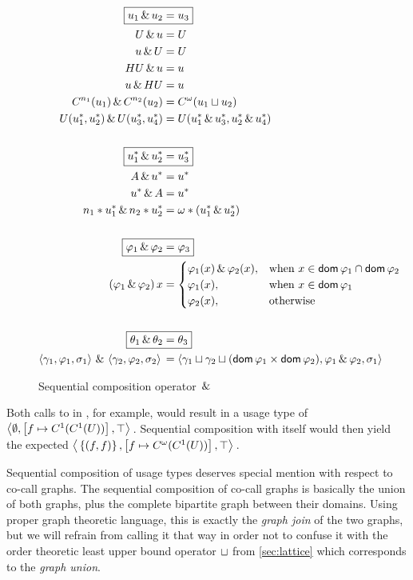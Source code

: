 \begin{figure}
\begin{alignat*}{1}
  \Aboxed{u_1 \both u_2 &= u_3} \\
  U \both u  &= U \\
  u \both U  &= U \\
  HU \both u &= u \\
  u \both HU &= u \\
  C^{n_1}(u_1) \both C^{n_2}(u_2) &= C^{\omega}(u_1 \llub u_2) \\
  U(u^*_1, u^*_2) \both U(u^*_3, u^*_4) &= U(u^*_1 \both u^*_3, u^*_2 \both u^*_4) \\
  &\\
  \Aboxed{u^*_1 \both u^*_2 &= u^*_3} \\
  A \both u^* &= u^* \\
  u^* \both A &= u^* \\ 
  n_1*u^*_1 \both n_2*u^*_2 &= \omega * (u^*_1 \both u^*_2) \\
  &\\
  \Aboxed{\varphi_1 \both \varphi_2 &= \varphi_3} \\
  (\varphi_1 \both \varphi_2)\,x &= \begin{cases}
    \varphi_1(x) \both \varphi_2(x),&\text{when } x \in \dom{\varphi_1} \cap \dom{\varphi_2} \\
    \varphi_1(x),&\text{when } x \in \dom{\varphi_1} \\
    \varphi_2(x),&\text{otherwise}
  \end{cases} \\
  &\\
  \Aboxed{\theta_1 \both \theta_2 &= \theta_3} \\
  \lTriple{\gamma_1}{\varphi_1}{\sigma_1} \both \lTriple{\gamma_2}{\varphi_2}{\sigma_2} &= \lTriple{\gamma_1 \llub \gamma_2 \llub (\dom{\varphi_1} \times \dom{\varphi_2})}{\varphi_1 \both \varphi_2}{\sigma_1} \\
\end{alignat*}
\caption{Sequential composition operator $\,\&\,$}
\label{fig:both}
\end{figure}

Both calls to  in , for example, would result in a usage type of $\left\langle{}\emptyset,\left[f\mapsto C^1(C^1(U))\right],\top\right\rangle{}$. 
Sequential composition with itself would then yield the expected $\left\langle{}\left\{(f,f)\right\},\left[f\mapsto C^\omega(C^1(U))\right],\top\right\rangle{}$.

Sequential composition of usage types deserves special mention with respect to co-call graphs.
The sequential composition of co-call graphs is basically the union of both graphs, plus the complete bipartite graph between their domains.
Using proper graph theoretic language, this is exactly the \emph{graph join} of the two graphs, but we will refrain from calling it that way in order not to confuse it with the order theoretic least upper bound operator $\sqcup$ from \cref{sec:lattice} which corresponds to the \emph{graph union}.


